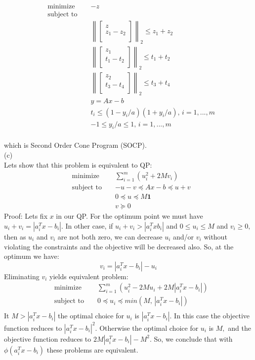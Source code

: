 \documentclass{article}
\begin{document}
\begin{align*}
&\text{minimize } && - z \\
&\text{subject to } && \\
& && 
\left\lVert
\begin{bmatrix}
z \\ z_1 - z_2\\
\end{bmatrix}
\right\rVert_2 \leq z_1 + z_2\\
& && \left\lVert
\begin{bmatrix}
z_1 \\ t_1 - t_2\\
\end{bmatrix}
\right\rVert_2 \leq t_1 + t_2\\
& && \left\lVert
\begin{bmatrix}
z_2 \\ t_3 - t_4\\
\end{bmatrix}
\right\rVert_2 \leq t_3 + t_4\\
& && y = A x - b \\
& && t_i \leq (1 - y_i / a)(1 + y_i / a),
\, i = 1, ..., m\\
& && -1 \leq y_i / a \leq 1, \, i = 1, ..., m\\
\end{align*}

which is Second Order Cone Program (SOCP). \\

(c)\\
Lets show that this problem is equivalent to QP:
\begin{align*}
&\text{minimize } && 
\sum_{i = 1}^m(u_i^2 + 2 M v_i) \\
&\text{subject to } && 
-u - v \preceq Ax - b \preceq u + v\\
& && 0 \preceq u \preceq M \boldsymbol{1}\\
& && v \succeq 0
\end{align*}
Proof: Lets fix $x$ in our QP. For the optimum point we must have \\
$u_i + v_i = |a_i^T x - b_i|.$
In other case, if 
$u_i + v_i > |a_i^T x b_i|$ and 
$0 \leq u_i \leq M$ and $v_i \geq 0, $ then as $u_i$ and $v_i$ are not both zero, we can decrease $u_i$ and/or $v_i$ without violating the constraints and the objective will be decreased also. So, at the optimum we have:
$$ v_i = |a_i^T x - b_i| - u_i$$ 
Eliminating $v_i$ yields equivalent problem:
\begin{align*}
&\text{minimize } && 
\sum_{i = 1}^m
(u_i^2 - 2 M u_i + 2 M |a_i^T x - b_i|) \\
&\text{subject to }
&& 0 \preceq u_i \preceq 
min(M, \, |a_i^T x - b_i|)\\
\end{align*}
It $M > |a_i^T x - b_i|$ the optimal choice for 
$u_i$ is $|a_i^T x - b_i|.$ In this case the objective function reduces to 
$|a_i^T x - b_i|^2.$ Otherwise the optimal choice for $u_i$ is $M,$ and the objective function reduces to $2 M |a_i^T x - b_i| - M^2.$ So, we conclude that with $\phi(a_i^T x - b_i)$ these problems are equivalent.
\end{document}
